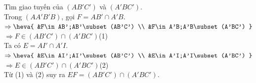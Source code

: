 \begin{ex}
{\begin{itemchoice}
			Tìm giao tuyến  của $(AB'C')$ và $(A'BC')$.\\
			 Trong $(AA'B'B)$, gọi $F=AB'\cap A'B$.\\
			 $\Rightarrow \heva{
			&F\in AB';AB'\subset  (AB'C') \\
			&F\in A'B;A'B\subset (A'BC') } $ $\Rightarrow F\in (AB'C')\cap (A'BC')$\quad  (1)\\
			Ta  có $E=AI'\cap A'I$.\\
			 $\Rightarrow \heva{
			&E\in AI';AI'\subset  (AB'C') \\
			&E\in A'I;A'I\subset (A'BC') } $ $\Rightarrow E\in (AB'C')\cap (A'BC')$\quad (2)\\ 
			Từ (1)  và (2) suy ra $EF=(AB'C')\cap (A'BC')$.
		\end{itemchoice}
	} 
\end{ex}


